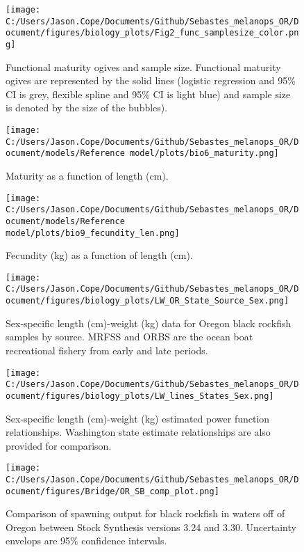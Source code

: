 \documentclass[11pt,
  english,
  letterpaper,
]{article}
\begin{document}
\begin{figure}
\centering
\texttt{[image: C:/Users/Jason.Cope/Documents/Github/Sebastes\_melanops\_OR/Document/figures/biology\_plots/Fig2\_func\_samplesize\_color.png]}
\caption{Functional maturity ogives and sample size. Functional maturity ogives are represented by the solid lines (logistic regression and 95\% CI is grey, flexible spline and 95\% CI is light blue) and sample size is denoted by the size of the bubbles).\label{fig:fxn-spline-mat-color}}
\end{figure}

\begin{figure}
\centering
\texttt{[image: C:/Users/Jason.Cope/Documents/Github/Sebastes\_melanops\_OR/Document/models/Reference model/plots/bio6\_maturity.png]}
\caption{Maturity as a function of length (cm).\label{fig:maturity}}
\end{figure}

\begin{figure}
\centering
\texttt{[image: C:/Users/Jason.Cope/Documents/Github/Sebastes\_melanops\_OR/Document/models/Reference model/plots/bio9\_fecundity\_len.png]}
\caption{Fecundity (kg) as a function of length (cm).\label{fig:fecundity}}
\end{figure}

\begin{figure}
\centering
\texttt{[image: C:/Users/Jason.Cope/Documents/Github/Sebastes\_melanops\_OR/Document/figures/biology\_plots/LW\_OR\_State\_Source\_Sex.png]}
\caption{Sex-specific length (cm)-weight (kg) data for Oregon black rockfish samples by source. MRFSS and ORBS are the ocean boat recreational fishery from early and late periods.\label{fig:len-weight-data}}
\end{figure}

\begin{figure}
\centering
\texttt{[image: C:/Users/Jason.Cope/Documents/Github/Sebastes\_melanops\_OR/Document/figures/biology\_plots/LW\_lines\_States\_Sex.png]}
\caption{Sex-specific length (cm)-weight (kg) estimated power function relationships. Washington state estimate relationships are also provided for comparison.\label{fig:len-weight-or-wa}}
\end{figure}

\clearpage

\begin{figure}
\centering
\texttt{[image: C:/Users/Jason.Cope/Documents/Github/Sebastes\_melanops\_OR/Document/figures/Bridge/OR\_SB\_comp\_plot.png]}
\caption{Comparison of spawning output for black rockfish in waters off of Oregon between Stock Synthesis versions 3.24 and 3.30. Uncertainty envelops are 95\% confidence intervals.\label{fig:ssb_bridge_comps}}
\end{figure}
\end{document}
